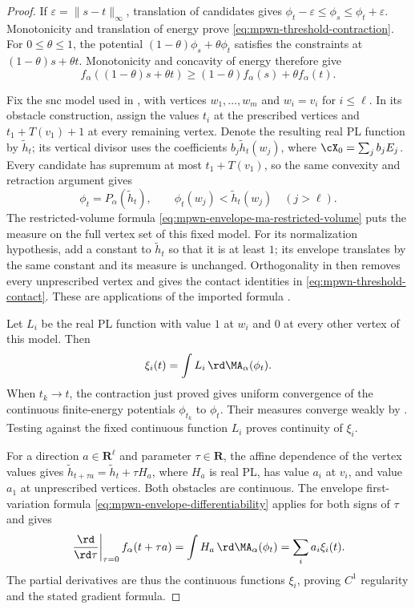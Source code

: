 \begin{proof}
If $\varepsilon=\|s-t\|_\infty$, translation of candidates gives
$\phi_t-\varepsilon\leq\phi_s\leq\phi_t+\varepsilon$.
Monotonicity and translation of energy prove \eqref{eq:mpwn-threshold-contraction}.
For $0\leq\theta\leq1$, the potential $(1-\theta)\phi_s+\theta\phi_t$ satisfies the constraints at $(1-\theta)s+\theta t$. Monotonicity and concavity of energy therefore give
\[
 f_\alpha((1-\theta)s+\theta t)\geq(1-\theta)f_\alpha(s)+\theta f_\alpha(t).
\]

Fix the snc model used in , with vertices $w_1,\ldots,w_m$ and $w_i=v_i$ for $i\leq\ell$.
In its obstacle construction, assign the values $t_i$ at the prescribed vertices and $t_1+T(v_1)+1$ at every remaining vertex. Denote the resulting real PL function by $\widetilde h_t$; its vertical divisor uses the coefficients $b_j\widetilde h_t(w_j)$, where $\cX_0=\sum_jb_jE_j$.
Every candidate has supremum at most $t_1+T(v_1)$, so the same convexity and retraction argument gives
\[
 \phi_t=P_\alpha(\widetilde h_t),
 \qquad \phi_t(w_j)<\widetilde h_t(w_j)\quad(j>\ell).
\]
The restricted-volume formula \eqref{eq:mpwn-envelope-ma-restricted-volume} puts the measure on the full vertex set of this fixed model. For its normalization hypothesis, add a constant to $\widetilde h_t$ so that it is at least $1$; its envelope translates by the same constant and its measure is unchanged. Orthogonality in  then removes every unprescribed vertex and gives the contact identities in \eqref{eq:mpwn-threshold-contact}. These are applications of the imported formula \cite[Proposition~4.2.2, p.~17, and proof of Theorem~1.5.1, p.~18]{MPWN25}.

Let $L_i$ be the real PL function with value $1$ at $w_i$ and $0$ at every other vertex of this model. Then
\[
                 \xi_i(t)=\int L_i\,\rd\MA_\alpha(\phi_t).
\]
When $t_k\to t$, the contraction just proved gives uniform convergence of the continuous finite-energy potentials $\phi_{t_k}$ to $\phi_t$. Their measures converge weakly by \cite[Proposition~2.3.2, pp.~11--12]{MPWN25}. Testing against the fixed continuous function $L_i$ proves continuity of $\xi_i$.

For a direction $a\in\mathbf R^\ell$ and parameter $\tau\in\mathbf R$, the affine dependence of the vertex values gives
$\widetilde h_{t+\tau a}=\widetilde h_t+\tau H_a$, where $H_a$ is real PL, has value $a_i$ at $v_i$, and value $a_1$ at unprescribed vertices. Both obstacles are continuous. The envelope first-variation formula \eqref{eq:mpwn-envelope-differentiability} applies for both signs of $\tau$ and gives
\[
 \left.\frac{\rd}{\rd\tau}\right|_{\tau=0}f_\alpha(t+\tau a)
 =\int H_a\,\rd\MA_\alpha(\phi_t)
 =\sum_i a_i\xi_i(t).
\]
The partial derivatives are thus the continuous functions $\xi_i$, proving $C^1$ regularity and the stated gradient formula.


\end{proof}
